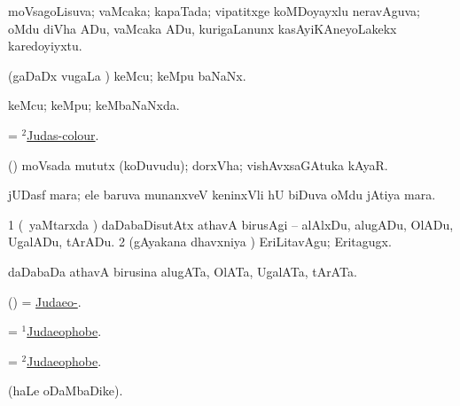 \bentry
{}
\gl{\gu}
\bmng
moVsagoLisuva; vaMcaka; kapaTada; vipatitxge koMDoyayxlu neravAguva;  oMdu diVha ADu, vaMcaka ADu, kurigaLanunx kasAyiKAneyoLakekx karedoyiyxtu. 
\emng
\eentry

\bentry
{}
\gl{\nA}
\bmng
(gaDaDx \mo vugaLa \vi) keMcu; keMpu baNaNx. 
\emng
\eentry

\bentry
{}
\gl{\gu}
\bmng
keMcu; keMpu; keMbaNaNxda. 
\emng
\eentry

\bentry
{}
\gl{\gu}
\bmng
=  \hyperlink{Judas-colour(2)}{$^2$Judas-colour}. 
\emng
\eentry

\bentry
{}
\gl{\nA}
\bmng
(\beY) moVsada mututx (koDuvudu); dorxVha; vishAvxsaGAtuka kAyaR. 
\emng
\eentry

\bentry
{}
\gl{\nA}
\bmng
jUDasf mara; ele baruva munanxveV keninxVli hU biDuva oMdu jAtiya mara. 
\emng
\eentry

\bentry
{}
\gl{\akirx}
\bmng
\bnum
\num{1} (\kanmu\ yaMtarxda \vi) daDabaDisutAtx athavA birusAgi -- alAlxDu, alugADu, OlADu, UgalADu, tArADu. 
\num{2} (gAyakana dhavxniya \vi) EriLitavAgu; Eritagugx. 
\enum
\emng
\eentry


\bentry
{}
\gl{\nA}
\bmng
daDabaDa athavA birusina alugATa, OlATa, UgalATa, tArATa. 
\emng
\eentry

\bentry
{}
\gl{\sapUpa}
\bmng
(\ame)  = \hyperlink{Judaeo-}{Judaeo-}. 
\emng
\eentry

\bentry
{}
\gl{\nA}
\bmng
 = \hyperlink{Judaeophobe(1)}{$^1$Judaeophobe}. 
\emng
\eentry

\bentry
{}
\gl{\gu}
\bmng
= \hyperlink{Judaeophobe(2)}{$^2$Judaeophobe}. 
\emng
\eentry

\bentry
{}
\gl{\saMkiSx}
\bmng
{} (haLe oDaMbaDike). 
\emng
\eentry

